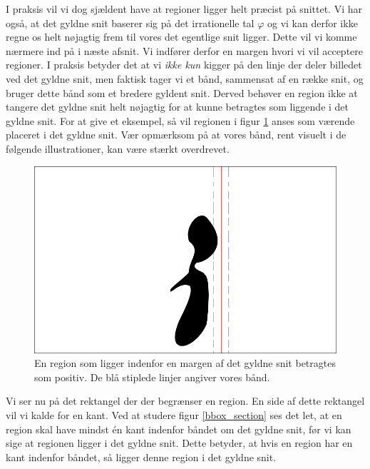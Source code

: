 {I praksis vil vi dog sjældent have at regioner ligger helt præcist på
snittet.
Vi har også, at det gyldne snit baserer sig på det
irrationelle tal $\varphi$ og vi kan derfor ikke regne os helt nøjagtig
frem til vores det egentlige snit ligger. Dette vil vi komme nærmere ind
på i næste afsnit. Vi indfører derfor en margen hvori vi vil acceptere
regioner.  I praksis betyder det at vi \emph{ikke kun} kigger på den
linje der deler billedet ved det gyldne snit, men faktisk tager vi et
bånd, sammensat af en række snit, og bruger dette bånd som et bredere
gyldent snit.  Derved behøver en region ikke at tangere det gyldne snit
helt nøjagtig for at kunne betragtes som liggende i det gyldne snit. For
at give et eksempel, så vil regionen i figur \ref{pos_naiv_margin_1}
anses som værende placeret i det gyldne snit.  Vær opmærksom på at vores
bånd, rent visuelt i de følgende illustrationer, kan være stærkt
overdrevet.
\begin{figure}[h]
    \begin{center}
        \includegraphics[scale=\imgscale,angle=0]{afsnit/vores_implementation/billeder/naiv_algoritme/naiv_positiv_blob_margin_1}
    \end{center}
    \caption[Positiv region i margen]{En region som
    ligger indenfor en margen af det gyldne snit betragtes som
    positiv. De blå stiplede linjer angiver vores bånd.}
    \label{pos_naiv_margin_1}
\end{figure}

Vi ser nu på det rektangel der der begrænser en region.  En side af
dette rektangel vil vi kalde for en kant. Ved at studere figur
\ref{bbox_section} ses det let, at en region skal have mindst én kant
indenfor båndet om det gyldne snit, før vi kan sige at regionen ligger i
det gyldne snit. Dette betyder, at hvis en region har en kant indenfor
båndet, så ligger denne region i det gyldne snit.

}
